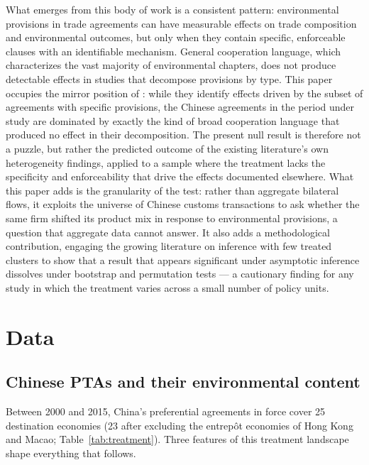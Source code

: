 \documentclass[12pt]{article}
\begin{document}
What emerges from this body of work is a consistent pattern: environmental provisions in trade agreements can have measurable effects on trade composition and environmental outcomes, but only when they contain specific, enforceable clauses with an identifiable mechanism. General cooperation language, which characterizes the vast majority of environmental chapters, does not produce detectable effects in studies that decompose provisions by type. This paper occupies the mirror position of \citet{brandi2020}: while they identify effects driven by the subset of agreements with specific provisions, the Chinese agreements in the period under study are dominated by exactly the kind of broad cooperation language that produced no effect in their decomposition. The present null result is therefore not a puzzle, but rather the predicted outcome of the existing literature's own heterogeneity findings, applied to a sample where the treatment lacks the specificity and enforceability that drive the effects documented elsewhere. What this paper adds is the granularity of the test: rather than aggregate bilateral flows, it exploits the universe of Chinese customs transactions to ask whether the same firm shifted its product mix in response to environmental provisions, a question that aggregate data cannot answer. It also adds a methodological contribution, engaging the growing literature on inference with few treated clusters \citep{cameron2008, abadie2023, mackinnon2017, conley2011} to show that a result that appears significant under asymptotic inference dissolves under bootstrap and permutation tests --- a cautionary finding for any study in which the treatment varies across a small number of policy units.

\section{Data}\label{sec:background}

\subsection{Chinese PTAs and their environmental content}

Between 2000 and 2015, China's preferential agreements in force cover 25 destination
economies (23 after excluding the entrepôt economies of Hong Kong and Macao;
Table~\ref{tab:treatment}). Three features of this treatment landscape
shape everything that follows.
\end{document}

